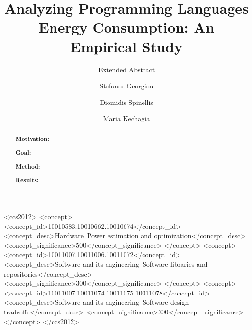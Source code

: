 \documentclass[sigconf]{acmart}
\begin{document}
\title{Analyzing Programming Languages Energy Consumption: An Empirical Study}
\subtitle{Extended Abstract}


\author{Stefanos Georgiou}

\author{Diomidis Spinellis}

\author{Maria Kechagia}

\renewcommand{\shortauthors}{S. Georgiou et al.}


\begin{abstract}
\noindent \textbf{Motivation:}

\noindent \textbf{Goal:}

\noindent \textbf{Method:}

\noindent \textbf{Results:}

\end{abstract}

%
%
\begin{CCSXML}
	<ccs2012>
	<concept>
	<concept_id>10010583.10010662.10010674</concept_id>
	<concept_desc>Hardware~Power estimation and optimization</concept_desc>
	<concept_significance>500</concept_significance>
	</concept>
	<concept>
	<concept_id>10011007.10011006.10011072</concept_id>
	<concept_desc>Software and its engineering~Software libraries and repositories</concept_desc>
	<concept_significance>300</concept_significance>
	</concept>
	<concept>
	<concept_id>10011007.10011074.10011075.10011078</concept_id>
	<concept_desc>Software and its engineering~Software design tradeoffs</concept_desc>
	<concept_significance>300</concept_significance>
	</concept>
	</ccs2012>
\end{CCSXML}
\end{document}
